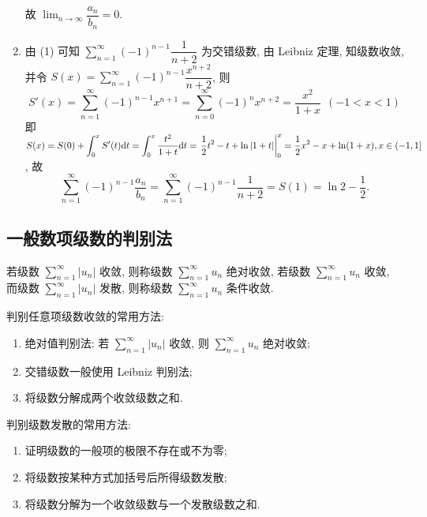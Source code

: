 \begin{solution}
\begin{enumerate}[label=(\arabic{*})]
              故 $\displaystyle\lim_{n\to\infty}\dfrac{a_n}{b_n}=0.$
        \item 由 (1) 可知 $\displaystyle\sum_{n=1}^{\infty}(-1)^{n-1}\dfrac{1}{n+2}$ 为交错级数, 由 Leibniz 定理, 知级数收敛, 并令 $S(x)=\displaystyle\sum_{n=1}^{\infty}(-1)^{n-1}\dfrac{x^{n+2}}{n+2}$, 则
              $$S'(x)=\sum_{n=1}^{\infty}(-1)^{n-1}x^{n+1}=\sum_{n=0}^{\infty}(-1)^nx^{n+2}=\dfrac{x^2}{1+x}~~(-1<x<1)$$
              即 $S(x)=S(0)+\displaystyle\int_{0}^{x}S'(t)\dd t=\int_{0}^{x}\dfrac{t^2}{1+t}\dd t=\eval{\dfrac{1}{2}t^2-t+\ln|1+t|}_{0}^{x}=\dfrac{1}{2}x^2-x+\ln(1+x),x\in(-1,1]$,
              故 $$\displaystyle\sum_{n=1}^{\infty}(-1)^{n-1}\dfrac{a_n}{b_n}=\sum_{n=1}^{\infty}(-1)^{n-1}\dfrac{1}{n+2}=S(1)=\ln 2-\dfrac{1}{2}.$$
    \end{enumerate}
\end{solution}

\subsection{一般数项级数的判别法}

\begin{definition}[绝对收敛与条件收敛]
    若级数 $\displaystyle \sum_{n=1}^{\infty}\left|u_{n}\right| $ 收敛, 则称级数 $\displaystyle \sum_{n=1}^{\infty} u_{n} $ 绝对收敛,
    若级数 $\displaystyle \sum_{n=1}^{\infty} u_{n} $ 收敛, 而级数 $\displaystyle  \sum_{n=1}^{\infty}\left|u_{n}\right| $ 发散, 则称级数 $\displaystyle \sum_{n=1}^{\infty} u_{n} $ 条件收敛.
\end{definition}

判别任意项级数收敛的常用方法:
\begin{enumerate}[label=(\arabic{*})]
    \item 绝对值判别法: 若 $\displaystyle  \sum_{n=1}^{\infty}\left|u_{n}\right| $ 收敛, 则 $\displaystyle  \sum_{n=1}^{\infty} u_{n} $ 绝对收敛;
    \item 交错级数一般使用 Leibniz 判别法;
    \item 将级数分解成两个收敛级数之和.
\end{enumerate}

判别级数发散的常用方法:
\begin{enumerate}[label=(\arabic{*})]
    \item 证明级数的一般项的极限不存在或不为零;
    \item 将级数按某种方式加括号后所得级数发散;
    \item 将级数分解为一个收敛级数与一个发散级数之和.
\end{enumerate}

